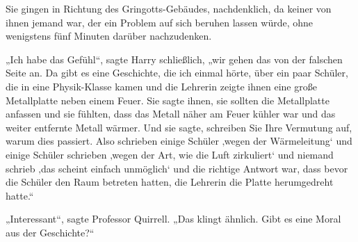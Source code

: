 Sie gingen in Richtung des Gringotts-Gebäudes, nachdenklich, da keiner von ihnen jemand war, der ein Problem auf sich beruhen lassen würde, ohne wenigstens fünf Minuten darüber nachzudenken.

„Ich habe das Gefühl“, sagte Harry schließlich, „wir gehen das von der falschen Seite an. Da gibt es eine Geschichte, die ich einmal hörte, über ein paar Schüler, die in eine Physik-Klasse kamen und die Lehrerin zeigte ihnen eine große Metallplatte neben einem Feuer. Sie sagte ihnen, sie sollten die Metallplatte anfassen und sie fühlten, dass das Metall näher am Feuer kühler war und das weiter entfernte Metall wärmer. Und sie sagte, schreiben Sie Ihre Vermutung auf, warum dies passiert. Also schrieben einige Schüler ‚wegen der Wärmeleitung‘ und einige Schüler schrieben ‚wegen der Art, wie die Luft zirkuliert‘ und niemand schrieb ‚das scheint einfach unmöglich‘ und die richtige Antwort war, dass bevor die Schüler den Raum betreten hatten, die Lehrerin die Platte herumgedreht hatte.“

„Interessant“, sagte Professor Quirrell.
„Das klingt ähnlich. Gibt es eine Moral aus der Geschichte?“

